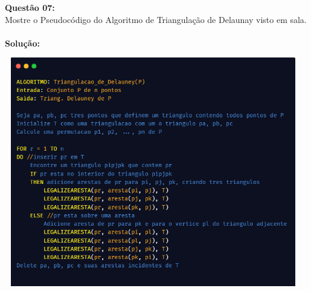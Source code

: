 \noindent\textbf{Questão 07:}\\
Mostre o Pseudocódigo do Algoritmo de Triangulação de Delaunay visto em
sala.\\
\\
\noindent\textbf{Solução:}
\begin{center}
    \includegraphics[width=13cm,height=10cm]{img_03.png}
\end{center}
\vspace{0.2cm}

